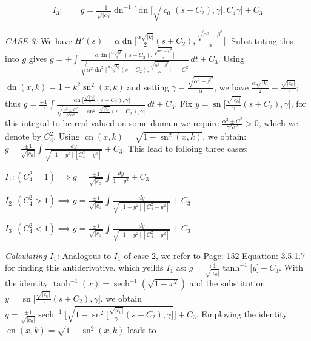 \documentclass[12pt]{article}
\theoremstyle{plain}
\theoremstyle{definition}
\theoremstyle{remark}
\begin{document}
 \begin{equation}\label{eqn: soln k<0, c_0 neq 0, g: case 2.3}
 	\boxed{I_3:\qquad g=\tfrac{\pm 1}{\sqrt{|c_0|}} \operatorname{dn}^{-1}\big[\operatorname{dn}\big[\sqrt{|c_0|}(s+C_2),\gamma\big],C_4 \gamma\big] + C_3}
 \end{equation}


 

 \textit{CASE 3:} We have \footnotesize\(H'(s)=\alpha\operatorname{dn}\!\big[\frac{\alpha\sqrt{|k|}}{2}(s+C_2), \frac{\sqrt{\alpha^2-\beta^2}}{\alpha}\big]\)\normalsize. Substituting this into \(g\) gives \footnotesize\(g =\pm \displaystyle \int \tfrac{\alpha\operatorname{dn}\!\big[\frac{\alpha\sqrt{|k|}}{2}(s+C_2), \frac{\sqrt{\alpha^2-\beta^2}}{\alpha}\big]}{\sqrt{\alpha^2\operatorname{dn}^2\!\big[\frac{\alpha\sqrt{|k|}}{2}(s+C_2), \frac{\sqrt{\alpha^2-\beta^2}}{\alpha}\big]\; \pm\; C^2}}\, dt + C_3\)\normalsize. Using \footnotesize\(\operatorname{dn}(x,k)=1-k^2\operatorname{sn}^2(x,k)\;\)\normalsize and setting \footnotesize\(\gamma=\frac{\sqrt{\alpha^2-\beta^2}}{\alpha}\)\normalsize, we have \footnotesize\(\frac{\alpha\sqrt{|k|}}{2}=\tfrac{\sqrt{|c_0|}}{\gamma}\)\normalsize; thus \footnotesize\(g =\tfrac{\pm 1}{\gamma}\displaystyle \int \tfrac{\operatorname{dn}\!\big[\frac{\sqrt{|c_0|}}{\gamma}(s+C_2), \gamma\big]}{\sqrt{\frac{\alpha^2 \pm C^2}{\gamma^2\alpha^2}-\operatorname{sn}^2\big[\frac{\sqrt{|c_0|}}{\gamma}(s+C_2), \gamma\big]}}\, dt + C_3\)\normalsize. Fix \footnotesize\(y=\operatorname{sn}\big[\frac{\sqrt{|c_0|}}{\gamma}(s+C_2), \gamma\big]\)\normalsize, for this integral to be real valued on some domain we require \footnotesize\(\frac{\alpha^2 \pm C^2}{\gamma^2\alpha^2}>0\)\normalsize, which we denote by \(C_4^2\).  Using \footnotesize\(\operatorname{cn}(x,k)=\sqrt{1-\operatorname{sn}^2(x,k)}\)\normalsize, we obtain: \footnotesize\(g=\tfrac{\pm 1}{\sqrt{|c_0|}} \displaystyle \int \tfrac{dy}{\sqrt{[1-y^2][C_4^2-y^2]}} + C_3\)\normalsize. This lead to folloing three cases:
 
 \(I_1: (C_4^2=1) \implies g=\frac{\pm 1}{\sqrt{|c_0|}} \displaystyle \int \tfrac{dy}{1-y^2} + C_3\)
 
 \(I_2: (C_4^2>1) \implies g=\tfrac{\pm 1}{\sqrt{|c_0|}} \displaystyle \int \tfrac{dy}{\sqrt{[1-y^2][C_4^2-y^2]}} + C_3\)
 
 \(I_3: (C_4^2<1) \implies g=\tfrac{\pm 1}{\sqrt{|c_0|}} \displaystyle \int \tfrac{dy}{\sqrt{[1-y^2][C_4^2-y^2]}} + C_3\)
 
 
 
 \textit{Calculating \(I_1\): } Analogous to \(I_1\) of case 2, we refer to \cite{JD} Page: 152 Equation: 3.5.1.7 for finding this antiderivative, which yeilds \(I_1\) as: \footnotesize\(g=\tfrac{\pm 1}{\sqrt{|c_0|}}\tanh^{-1}\big[y\big]+C_3\)\normalsize. With the identity \(\tanh^{-1}(x)=\operatorname{sech}^{-1}(\sqrt{1-x^2})\) and the substitution \footnotesize\(y=\operatorname{sn}\big[\frac{\sqrt{|c_0|}}{\gamma}(s+C_2),\gamma\big]\)\normalsize, we obtain \footnotesize\(g=\tfrac{\pm 1}{\sqrt{|c_0|}}\operatorname{sech}^{-1}\big[\sqrt{1-\operatorname{sn}^2\big[\frac{\sqrt{|c_0|}}{\gamma}(s+C_2),\gamma\big]}\big]+C_3\)\normalsize. Employing the identity \footnotesize\(\operatorname{cn}(x,k)=\sqrt{1-\operatorname{sn}^2(x,k)}\;\)\normalsize leads to
 
\end{document}
